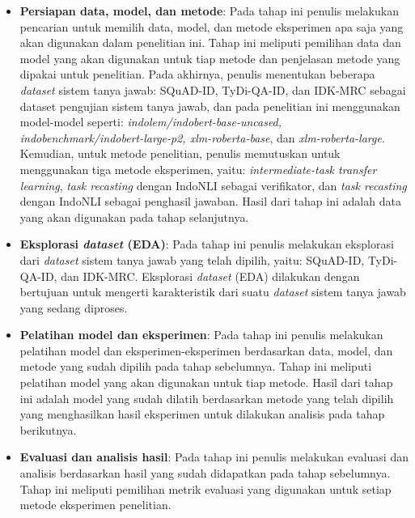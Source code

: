 \begin{itemize}
    
    \item \textbf{Persiapan data, model, dan metode}: Pada tahap ini penulis melakukan pencarian untuk memilih data, model, dan metode eksperimen apa saja yang akan digunakan dalam penelitian ini. Tahap ini meliputi pemilihan data dan model yang akan digunakan untuk tiap metode dan penjelasan metode yang dipakai untuk penelitian. Pada akhirnya, penulis menentukan beberapa \emph{dataset} sistem tanya jawab: SQuAD-ID, TyDi-QA-ID, dan IDK-MRC sebagai dataset pengujian sistem tanya jawab, dan pada penelitian ini menggunakan model-model seperti: \emph{indolem/indobert-base-uncased, indobenchmark/indobert-large-p2, xlm-roberta-base}, dan \emph{xlm-roberta-large}. Kemudian, untuk metode penelitian, penulis memutuskan untuk menggunakan tiga metode eksperimen, yaitu: \emph{intermediate-task transfer learning}, \emph{task recasting} dengan IndoNLI sebagai verifikator, dan \emph{task recasting} dengan IndoNLI sebagai penghasil jawaban. Hasil dari tahap ini adalah data yang akan digunakan pada tahap selanjutnya.

    \item \textbf{Eksplorasi \emph{dataset} (EDA)}: Pada tahap ini penulis melakukan eksplorasi dari \emph{dataset} sistem tanya jawab yang telah dipilih, yaitu: SQuAD-ID, TyDi-QA-ID, dan IDK-MRC. Eksplorasi \emph{dataset} (EDA) dilakukan dengan bertujuan untuk mengerti karakteristik dari suatu \emph{dataset} sistem tanya jawab yang sedang diproses.
    
    \item \textbf{Pelatihan model dan eksperimen}: Pada tahap ini penulis melakukan pelatihan model dan eksperimen-eksperimen berdasarkan data, model, dan metode yang sudah dipilih pada tahap sebelumnya. Tahap ini meliputi pelatihan model yang akan digunakan untuk tiap metode. Hasil dari tahap ini adalah model yang sudah dilatih berdasarkan metode yang telah dipilih yang menghasilkan hasil eksperimen untuk dilakukan analisis pada tahap berikutnya.

    \item \textbf{Evaluasi dan analisis hasil}: Pada tahap ini penulis melakukan evaluasi dan analisis berdasarkan hasil yang sudah didapatkan pada tahap sebelumnya. Tahap ini meliputi pemilihan metrik evaluasi yang digunakan untuk setiap metode eksperimen penelitian.

\end{itemize}

